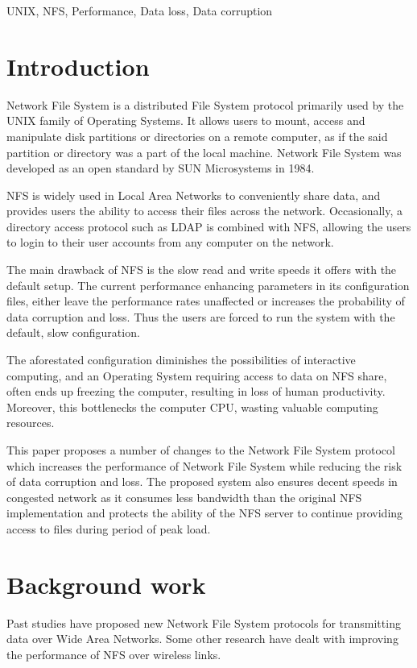 \documentclass[conference]{IEEEtran}
\begin{document}
\begin{IEEEkeywords}
UNIX,
NFS,
Performance,
Data loss,
Data corruption
\end{IEEEkeywords}

\section{Introduction}
Network File System is a distributed File System protocol primarily used by the  
UNIX family of Operating Systems. It allows users to mount, access and
manipulate disk partitions or directories on a remote computer, as if the
said partition or directory was a part of the local machine. Network File
System was developed as an open standard by SUN Microsystems in 1984.

NFS is widely used in Local Area Networks to conveniently share data, and
provides users the ability to access their files across the network.
Occasionally, a directory access protocol such as LDAP is combined with NFS,
allowing the users to login to their user accounts from any computer on the 
network.

The main drawback of NFS is the slow read and write speeds it offers with 
the default setup. The current performance enhancing parameters in its 
configuration files, either leave the performance rates unaffected or 
increases the probability of data corruption and loss. Thus the users are 
forced to run the system with the default, slow configuration.

The aforestated configuration diminishes the possibilities of interactive 
computing, and an Operating System requiring access to data on NFS share, 
often ends up freezing the computer, resulting in loss of human productivity.
Moreover, this bottlenecks the computer CPU, wasting valuable computing 
resources. 

This paper proposes a number of changes to the Network File System protocol
which increases the performance of Network File System while reducing
the risk of data corruption and loss. The proposed system also ensures
decent speeds in congested network as it consumes less bandwidth than the 
original NFS implementation and protects the ability of the NFS server to
continue providing access to files during period of peak load.

\section{Background work}
Past studies have proposed new Network File System protocols for
transmitting data over Wide Area Networks. Some other research have dealt
with improving the performance of NFS over wireless links.
\end{document}
